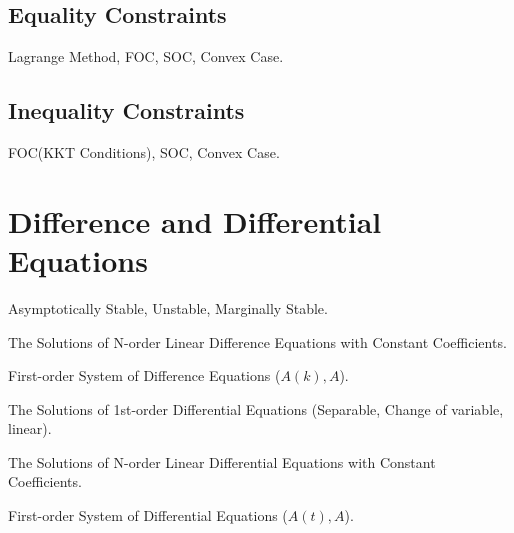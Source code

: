 \subsection{Equality Constraints}
Lagrange Method, FOC, SOC, Convex Case.

\subsection{Inequality Constraints}
FOC(KKT Conditions), SOC, Convex Case.

\section{Difference and Differential Equations}

Asymptotically Stable, Unstable, Marginally Stable.

The Solutions of N-order Linear Difference Equations with Constant Coefficients.

First-order System of Difference Equations ($A(k), A$).

The Solutions of 1st-order Differential Equations (Separable, Change of variable, linear).

The Solutions of N-order Linear Differential Equations with Constant Coefficients.

First-order System of Differential Equations ($A(t), A$).


